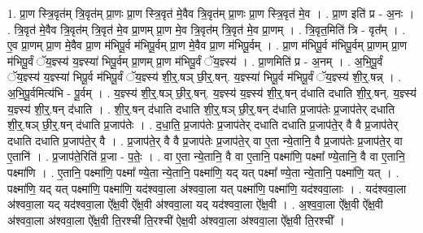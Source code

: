 \documentclass[17pt]{extarticle}
\begin{document}
1. प्रा॒ण स्त्रि॒वृत॑म् त्रि॒वृत॑म् प्रा॒णः प्रा॒ण स्त्रि॒वृत॑ मे॒वैव त्रि॒वृत॑म् प्रा॒णः प्रा॒ण स्त्रि॒वृत॑ मे॒व । . प्रा॒ण इति॑ प्र - अ॒नः । . त्रि॒वृत॑ मे॒वैव त्रि॒वृत॑म् त्रि॒वृत॑ मे॒व प्रा॒णम् प्रा॒ण मे॒व त्रि॒वृत॑म् त्रि॒वृत॑ मे॒व प्रा॒णम् । . त्रि॒वृत॒मिति॑ त्रि - वृत᳚म् । . ए॒व प्रा॒णम् प्रा॒ण मे॒वैव प्रा॒ण म॑भिपू॒र्व म॑भिपू॒र्वम् प्रा॒ण मे॒वैव प्रा॒ण म॑भिपू॒र्वम् । . प्रा॒ण म॑भिपू॒र्व म॑भिपू॒र्वम् प्रा॒णम् प्रा॒ण म॑भिपू॒र्वं ॅय॒ज्ञ्स्य॑ य॒ज्ञ्स्या॑ भिपू॒र्वम् प्रा॒णम् प्रा॒ण म॑भिपू॒र्वं ॅय॒ज्ञ्स्य॑ । . प्रा॒णमिति॑ प्र - अ॒नम् । . अ॒भि॒पू॒र्वं ॅय॒ज्ञ्स्य॑ य॒ज्ञ्स्या॑ भिपू॒र्व म॑भिपू॒र्वं ॅय॒ज्ञ्स्य॑ शी॒र्॒.षञ् छी॒र्॒.षन्. य॒ज्ञ्स्या॑ भिपू॒र्व म॑भिपू॒र्वं ॅय॒ज्ञ्स्य॑ शी॒र्॒.षन्न् । . अ॒भि॒पू॒र्वमित्य॑भि - पू॒र्वम् । . य॒ज्ञ्स्य॑ शी॒र्॒.षञ् छी॒र्॒.षन्. य॒ज्ञ्स्य॑ य॒ज्ञ्स्य॑ शी॒र्॒.षन् द॑धाति दधाति शी॒र्॒.षन्. य॒ज्ञ्स्य॑ य॒ज्ञ्स्य॑ शी॒र्॒.षन् द॑धाति । . शी॒र्॒.षन् द॑धाति दधाति शी॒र्॒.षञ् छी॒र्॒.षन् द॑धाति प्र॒जाप॑तेः प्र॒जाप॑तेर् दधाति शी॒र्॒.षञ् छी॒र्॒.षन् द॑धाति प्र॒जाप॑तेः । . द॒धा॒ति॒ प्र॒जाप॑तेः प्र॒जाप॑तेर् दधाति दधाति प्र॒जाप॑ते॒र् वै वै प्र॒जाप॑तेर् दधाति दधाति प्र॒जाप॑ते॒र् वै । . प्र॒जाप॑ते॒र् वै वै प्र॒जाप॑तेः प्र॒जाप॑ते॒र् वा ए॒ता न्ये॒तानि॒ वै प्र॒जाप॑तेः प्र॒जाप॑ते॒र् वा ए॒तानि॑ । . प्र॒जाप॑ते॒रिति॑ प्र॒जा - प॒तेः॒ । . वा ए॒ता न्ये॒तानि॒ वै वा ए॒तानि॒ पक्ष्मा॑णि॒ पक्ष्मा᳚ ण्ये॒तानि॒ वै वा ए॒तानि॒ पक्ष्मा॑णि । . ए॒तानि॒ पक्ष्मा॑णि॒ पक्ष्मा᳚ ण्ये॒ता न्ये॒तानि॒ पक्ष्मा॑णि॒ यद् यत् पक्ष्मा᳚ ण्ये॒ता न्ये॒तानि॒ पक्ष्मा॑णि॒ यत् । . पक्ष्मा॑णि॒ यद् यत् पक्ष्मा॑णि॒ पक्ष्मा॑णि॒ यद॑श्ववा॒ला अ॑श्ववा॒ला यत् पक्ष्मा॑णि॒ पक्ष्मा॑णि॒ यद॑श्ववा॒लाः । . यद॑श्ववा॒ला अ॑श्ववा॒ला यद् यद॑श्ववा॒ला ऐ᳚क्ष॒वी ऐ᳚क्ष॒वी अ॑श्ववा॒ला यद् यद॑श्ववा॒ला ऐ᳚क्ष॒वी । . अ॒श्व॒वा॒ला ऐ᳚क्ष॒वी ऐ᳚क्ष॒वी अ॑श्ववा॒ला अ॑श्ववा॒ला ऐ᳚क्ष॒वी ति॒रश्ची॑ ति॒रश्ची॑ ऐक्ष॒वी अ॑श्ववा॒ला अ॑श्ववा॒ला ऐ᳚क्ष॒वी ति॒रश्ची᳚ । \newline
\end{document}
